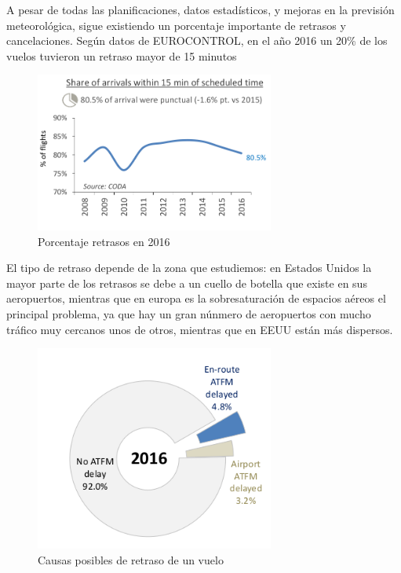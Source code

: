 	
A pesar de todas las planificaciones, datos estadísticos, y mejoras en la previsión meteorológica, sigue existiendo un porcentaje importante de retrasos y cancelaciones. Según datos de EUROCONTROL, en el año 2016 un 20\% de los vuelos tuvieron un retraso mayor de 15 minutos
\begin{figure}[H]
	\begin{center}
		\centering
		\includegraphics[width=0.7\textwidth]{./imagenes/introduccion/retrasos.png}
		\caption{Porcentaje retrasos en 2016}
		\label{fig: Porcentaje retrasos en 2016}
	\end{center}
\end{figure}

El tipo de retraso depende de la zona que estudiemos: en Estados Unidos la mayor parte de los retrasos se debe a un cuello de botella que existe en sus aeropuertos, mientras que en europa es la sobresaturación de espacios aéreos el principal problema, ya que hay un gran núnmero de aeropuertos con mucho tráfico muy cercanos unos de otros, mientras que en EEUU están más dispersos.
\begin{figure}[H]
	\begin{center}
		\centering
		\includegraphics[width=0.7\textwidth]{./imagenes/introduccion/tiposRetrasos.png}
		\caption{Causas posibles de retraso de un vuelo}
		\label{fig: Causas posibles de retraso de un vuelo}
	\end{center}
\end{figure}

